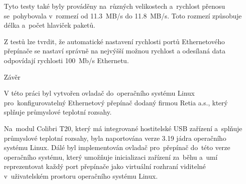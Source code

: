 {Tyto testy také byly prováděny na~různých velikostech a~rychlost přenosu se~pohybovala v~rozmezí od 11.3~MB/s do 11.8~MB/s.
Toto rozmezí způsobuje délka a~počet hlaviček paketů.


Z testů lze tvrdit, že automatické nastavení rychlosti portů Ethernetového přepínače se nastaví správně na nejvýšší možnou rychlost a odesílaná data odpovídají rychlosti 100~Mb/s Ethernetu.



\chap Závěr

V této práci byl vytvořen ovladač do~operačního systému Linux pro~konfigurovatelný Ethernetový přepínač dodaný firmou Retia a.s., který splňuje průmyslové teplotní rozsahy.

Na~modul Colibri T20, který má integrované hostitelské USB zařízení a~splňuje průmyslové teplotní rozsahy, byla naportována verze 3.19 jádra operačního systému Linux.
Dálé byl implementován ovladač pro~přepínač do~této verze operačního systému, který umožňuje inicializaci zařízení za~běhu a~umí reprezentovat každý port přepínače jako virtuální rozhraní viditelné v~uživatelském prostoru operačního systému Linux.



}
